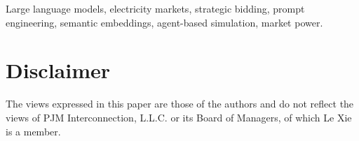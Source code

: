 \documentclass[conference]{IEEEtran}
\begin{document}
\begin{IEEEkeywords}
Large language models, electricity markets, strategic bidding, prompt engineering, semantic embeddings, agent-based simulation, market power.
\end{IEEEkeywords}













\section*{Disclaimer}

The views expressed in this paper are those of the authors and do not reflect the views of PJM Interconnection, L.L.C. or its Board of Managers, of which Le Xie is a member.




\end{document}
